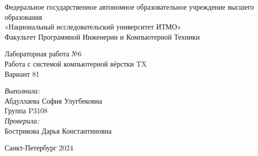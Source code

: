 \begin{center}
\normalsize
Федеральное государственное автономное образовательное учреждение высшего образования\\
«Национальный исследовательский университет ИТМО»\\
Факультет Программной Инженерии и Компьютерной Техники\\
\hfill

\vspace{7cm}
\Large Лабораторная работа №6\\
Работа с системой компьютерной вёрстки T\raisebox{-0.3em}{E}X\\
Вариант 81\\
\end{center}

\vspace{6.5cm}

\begin{flushright}
\textit{Выполнила:} \\
Абдуллаева София Улугбековна\\
Группа P3108\\
\vspace{0.3cm}
\textit{Проверила:} \\
Бострикова Дарья Константиновна\\
\end{flushright}
    
\vfill

\vspace{3.65cm}
\begin{center} 
Санкт-Петербург 2024
\end{center}

\newpage